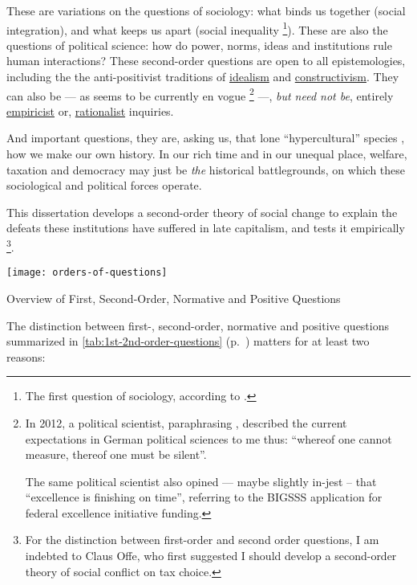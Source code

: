These are variations on the questions of sociology: what binds us together (social integration), and what keeps us apart (social inequality
\footnote{
	The first question of sociology, according to \citet[66]{Dahrendorf1966}.
}).
These are also the questions of political science: how do power, norms, ideas and institutions rule human interactions? 
These second-order questions are open to all epistemologies, including the the anti-positivist traditions of \hyperref[itm:idealism]{idealism} and \hyperref[itm:constructivism]{constructivism}. 
They can also be --- as seems to be currently en vogue
\footnote{
	In 2012, a political scientist, paraphrasing \cite{Wittgenstein1998}, described the current expectations in German political sciences to me thus: ``whereof one cannot measure, thereof one must be silent''.  %
	
	The same political scientist also opined --- maybe slightly in-jest -- that ``excellence is finishing on time'', referring to the \gls{BIGSSS} application for federal excellence initiative funding.
}
---, \emph{but need not be}, entirely  \hyperref[itm:empiricism]{empiricist} or, \hyperref[itm:rationalism]{rationalist} inquiries. 

And important questions, they are, asking us, that lone ``hypercultural'' species \citep{Henrich2004}, how we make our own history. 
In our rich time and in our unequal place, welfare, taxation and democracy may just be \emph{the} historical battlegrounds, on which these sociological and political forces operate. 

This dissertation develops a second-order theory of social change to explain the defeats these institutions have suffered in late capitalism, and tests it empirically
\footnote{
	For the distinction between first-order and second order questions, I am indebted to Claus Offe, who first suggested I should develop a second-order theory of social conflict on tax choice.
}.

\begin{table}[htbp]
	\centering
	\texttt{[image: orders-of-questions]}  
	\caption{Overview of First, Second-Order, Normative and Positive Questions}
	\label{tab:1st-2nd-order-questions}
\end{table} 

The distinction between first-, second-order, normative and positive questions summarized in \autoref{tab:1st-2nd-order-questions} (p.~\pageref{tab:1st-2nd-order-questions}) matters for at least two reasons:

